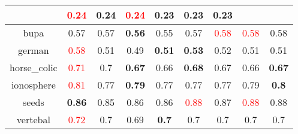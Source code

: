 \documentclass{article}%
\begin{document}
\begin{tabular}{c|cccccccc}
{}&\textcolor{red}{ 
0.24
}&0.24&\textcolor{red}{ 
0.24
}&0.23&0.23&0.23\\%
\hline%
bupa&0.57&0.57&\textbf{0.56}&0.55&0.57&\textcolor{red}{ 
0.58
}&\textcolor{red}{ 
0.58
}&0.58\\%
\hline%
german&\textcolor{red}{ 
0.58
}&0.51&0.49&\textbf{0.51}&\textbf{0.53}&0.52&0.51&0.51\\%
\hline%
horse\_colic&\textcolor{red}{ 
0.71
}&0.7&\textbf{0.67}&0.66&\textbf{0.68}&0.67&0.66&\textbf{0.67}\\%
\hline%
ionosphere&\textcolor{red}{ 
0.81
}&0.77&\textbf{0.79}&0.77&0.77&0.77&0.79&\textbf{0.8}\\%
\hline%
seeds&\textbf{0.86}&0.85&0.86&0.86&\textcolor{red}{ 
0.88
}&0.87&\textcolor{red}{ 
0.88
}&0.88\\%
\hline%
vertebal&\textcolor{red}{ 
0.72
}&0.7&0.69&\textbf{0.7}&0.7&0.7&0.7&0.7\\%
\hline%
\end{tabular}

%
\end{document}

